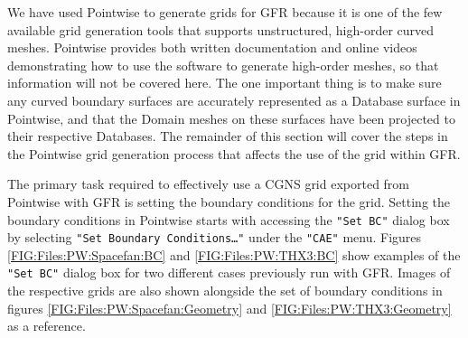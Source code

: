 We have used Pointwise to generate grids for GFR because it is one of the few
available grid generation tools that supports unstructured,
high-order curved meshes.
%
Pointwise provides both written documentation and online videos demonstrating
how to use the software to generate high-order meshes, so that information will
not be covered here.
%
The one important thing is to make sure any curved boundary surfaces are
accurately represented as a Database surface in Pointwise, and that the Domain
meshes on these surfaces have been projected to their respective Databases.
%
The remainder of this section will cover the steps in the Pointwise grid
generation process that affects the use of the grid within GFR.


\label{SEC:Files:Grid_Input:CGNS:PWBC}

The primary task required to effectively use a CGNS grid exported from Pointwise
with GFR is setting the boundary conditions for the grid.
%
Setting the boundary conditions in Pointwise starts with accessing the
\texttt{"Set BC"} dialog box by selecting \texttt{"Set Boundary
Conditions\ldots"} under the \texttt{"CAE"} menu.
%
Figures \ref{FIG:Files:PW:Spacefan:BC} and \ref{FIG:Files:PW:THX3:BC} show
examples of the \texttt{"Set BC"} dialog box for two different cases previously
run with GFR.
%
Images of the respective grids are also shown alongside the set of
boundary conditions in figures \ref{FIG:Files:PW:Spacefan:Geometry} and
\ref{FIG:Files:PW:THX3:Geometry} as a reference.


